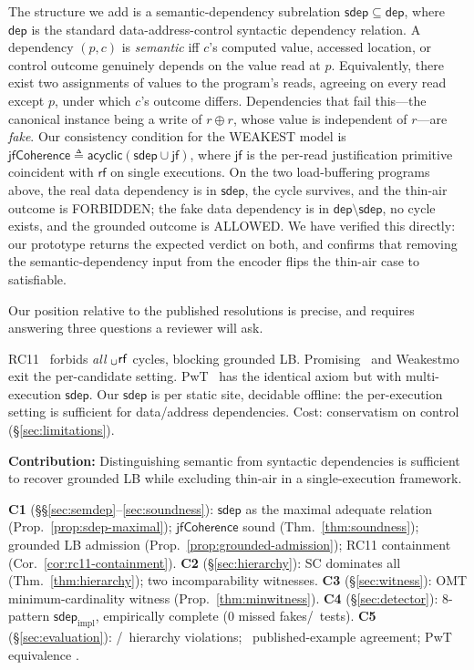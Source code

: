 \documentclass{llncs}
\newcommand{\sdep}{\mathsf{sdep}}
\newcommand{\dep}{\mathsf{dep}}
\newcommand{\rf}{\mathsf{rf}}
\newcommand{\jf}{\mathsf{jf}}
\newcommand{\sdepimpl}{\mathsf{sdep}_{\mathrm{impl}}}
\newcommand{\jfCoherence}{\textsf{jfCoherence}}
\begin{document}
The structure we add is a semantic-dependency subrelation $\sdep \subseteq
\dep$, where $\dep$ is the standard data-address-control syntactic dependency
relation. A dependency $(p, c)$ is \emph{semantic} iff $c$'s computed value,
accessed location, or control outcome genuinely depends on the value read at
$p$. Equivalently, there exist two assignments of values to the program's
reads, agreeing on every read except $p$, under which $c$'s outcome differs.
Dependencies that fail this---the canonical
instance being a write of $r \oplus r$, whose value is independent of
$r$---are \emph{fake}. Our consistency condition for the WEAKEST model is
$\jfCoherence \triangleq \mathsf{acyclic}(\sdep \cup \jf)$, where $\jf$ is
the per-read justification primitive~\cite{chakraborty2019grounding}
coincident with $\rf$ on single executions. On the two load-buffering programs
above, the real data dependency is in $\sdep$, the cycle survives, and the
thin-air outcome is FORBIDDEN; the fake data dependency is in $\dep \setminus
\sdep$, no cycle exists, and the grounded outcome is ALLOWED. We have verified
this directly: our prototype returns the expected verdict on both, and confirms
that removing the semantic-dependency input from the encoder flips the thin-air
case to satisfiable.

Our position relative to the published resolutions is precise, and requires
answering three questions a reviewer will ask.

RC11~\cite{lahav2017repairing} forbids \emph{all} $\sb \cup \rf$ cycles, blocking grounded LB.
Promising~\cite{kang2017promising} and Weakestmo~\cite{chakraborty2019grounding} exit the
per-candidate setting. PwT~\cite{jeffrey2022leaky} has the identical axiom but with
multi-execution $\sdep$. Our $\sdep$ is per static site, decidable offline:
the per-execution setting is sufficient for data/address dependencies. Cost:
conservatism on control (\S\ref{sec:limitations}).

\noindent\textbf{Contribution:} Distinguishing semantic from syntactic dependencies is sufficient to recover grounded LB while excluding thin-air in a single-execution framework.

\noindent\textbf{C1} (\S\S\ref{sec:semdep}--\ref{sec:soundness}): $\sdep$ as the maximal adequate relation (Prop.~\ref{prop:sdep-maximal}); $\jfCoherence$ sound (Thm.~\ref{thm:soundness}); grounded LB admission (Prop.~\ref{prop:grounded-admission}); RC11 containment (Cor.~\ref{cor:rc11-containment}).
\textbf{C2} (\S\ref{sec:hierarchy}): SC dominates all (Thm.~\ref{thm:hierarchy}); two incomparability witnesses.
\textbf{C3} (\S\ref{sec:witness}): OMT minimum-cardinality witness (Prop.~\ref{thm:minwitness}).
\textbf{C4} (\S\ref{sec:detector}): 8-pattern $\sdepimpl$, empirically complete (0 missed fakes/\CorpusSize~tests).
\textbf{C5} (\S\ref{sec:evaluation}): \HierarchyViolations/\CorpusSize~hierarchy violations; \PublishedExampleAgreement~published-example agreement; PwT equivalence \PwtAgreement.
\end{document}
